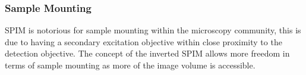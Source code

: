
\subsubsection{Sample Mounting}

SPIM is notorious for sample mounting within the microscopy community, this is due to having a secondary excitation objective within close proximity to the detection objective.
The concept of the inverted SPIM \cite{Wu2011} allows more freedom in terms of sample mounting as more of the image volume is accessible.



